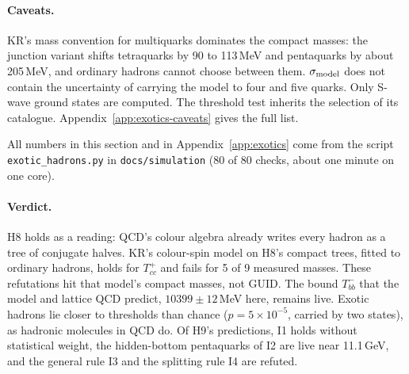 \paragraph{Caveats.} KR's mass convention for multiquarks dominates the compact masses: the junction variant shifts tetraquarks by 90
to 113\,MeV and pentaquarks by about 205\,MeV, and ordinary hadrons cannot choose between them. $\sigma_{\rm model}$ does not contain the
uncertainty of carrying the model to four and five quarks. Only S-wave ground states are computed. The threshold test inherits the
selection of its catalogue. Appendix~\ref{app:exotics-caveats} gives the full list.

All numbers in this section and in Appendix~\ref{app:exotics} come from the script \texttt{exotic\_hadrons.py} in
\texttt{docs/simulation} (80 of 80 checks, about one minute on one core).

\paragraph{Verdict.} H8 holds as a reading: QCD's colour algebra already writes every hadron as a tree of conjugate halves. KR's
colour-spin model on H8's compact trees, fitted to ordinary hadrons, holds for $T_{cc}^+$ and fails for 5 of 9 measured masses. These
refutations hit that model's compact masses, not GUID. The bound $T_{bb}^-$ that the model and lattice QCD predict, $10399\pm12$\,MeV
here, remains live. Exotic hadrons lie closer to thresholds than chance ($p=5\times10^{-5}$, carried by two states), as hadronic
molecules in QCD do. Of H9's predictions, I1 holds without statistical weight, the hidden-bottom pentaquarks of I2 are live near 11.1\,GeV,
and the general rule I3 and the splitting rule I4 are refuted.
